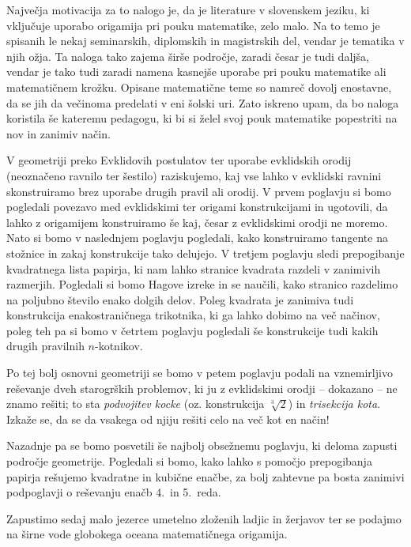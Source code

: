 Največja motivacija za to nalogo je, da je literature v slovenskem jeziku, ki vključuje uporabo origamija pri pouku matematike, zelo malo. Na to temo je spisanih le nekaj seminarskih, diplomskih in magistrskih del, vendar je tematika v njih ožja. Ta naloga tako zajema širše področje, zaradi česar je tudi daljša, vendar je tako tudi zaradi namena kasnejše uporabe pri pouku matematike ali matematičnem krožku. Opisane matematične teme so namreč dovolj enostavne, da se jih da večinoma predelati v eni šolski uri. Zato iskreno upam, da bo naloga koristila še kateremu pedagogu, ki bi si želel svoj pouk matematike popestriti na nov in zanimiv način.

V geometriji preko Evklidovih postulatov ter uporabe evklidskih orodij (neoznačeno ravnilo ter šestilo) raziskujemo, kaj vse lahko v evklidski ravnini skonstruiramo brez uporabe drugih pravil ali orodij. V prvem poglavju si bomo pogledali povezavo med evklidskimi ter origami konstrukcijami in ugotovili, da lahko z origamijem konstruiramo še kaj, česar z evklidskimi orodji ne moremo. Nato si bomo v naslednjem poglavju pogledali, kako konstruiramo tangente na stožnice in zakaj konstrukcije tako delujejo. V tretjem poglavju sledi prepogibanje kvadratnega lista papirja, ki nam lahko stranice kvadrata razdeli v zanimivih razmerjih. Pogledali si bomo Hagove izreke in se naučili, kako stranico razdelimo na poljubno število enako dolgih delov. Poleg kvadrata je zanimiva tudi konstrukcija enakostraničnega trikotnika, ki ga lahko dobimo na več načinov, poleg teh pa si bomo v četrtem poglavju pogledali še konstrukcije tudi kakih drugih pravilnih $n$-kotnikov.

Po tej bolj osnovni geometriji se bomo v petem poglavju podali na vznemirljivo reševanje dveh starogrških problemov, ki ju z evklidskimi orodji -- dokazano -- ne znamo rešiti; to sta \emph{podvojitev kocke} (oz. konstrukcija $\sqrt[3]{2}$) in \emph{trisekcija kota}. Izkaže se, da se da vsakega od njiju rešiti celo na več kot en način!

Nazadnje pa se bomo posvetili še najbolj obsežnemu poglavju, ki deloma zapusti področje geometrije. Pogledali si bomo, kako lahko s pomočjo prepogibanja papirja rešujemo kvadratne in kubične enačbe, za bolj zahtevne pa bosta zanimivi podpoglavji o reševanju enačb 4.\ in 5.\ reda.

Zapustimo sedaj malo jezerce umetelno zloženih ladjic in žerjavov ter se podajmo na širne vode globokega oceana matematičnega origamija.